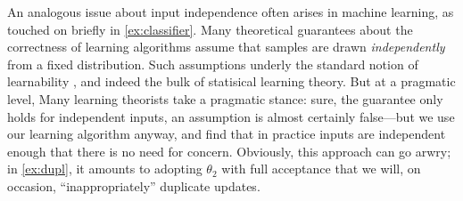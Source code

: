 \begin{subappendices}


    An analogous issue about input independence
     	often arises in machine learning,
    	as touched on briefly in \cref{ex:classifier}.
    Many theoretical guarantees about the correctness of
    learning algorithms assume that samples
    are drawn \emph{independently} from a fixed distribution. 
    Such assumptions underly the standard notion of
    learnability \parencite{valiant1984theory},
    and indeed the bulk of statisical learning theory.
    But at a pragmatic level, 
    Many learning theorists take a pragmatic
    stance: 
    sure, the guarantee only holds for independent inputs, an
    assumption is almost certainly false---but we use our learning
    algorithm anyway, and find that in practice inputs are independent
    enough that there is no need for concern.
    Obviously, this approach can go arwry;
    in \cref{ex:dupl}, it amounts to
    	adopting $\theta_2$
    	with full acceptance
    	that we will, on occasion,
    	``inappropriately'' duplicate updates.


\end{subappendices}
